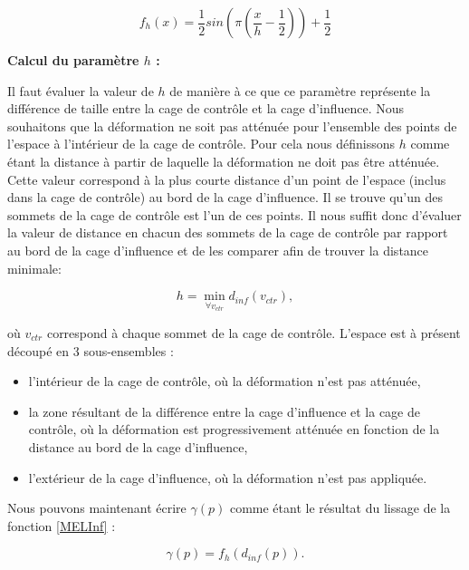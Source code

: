\begin{equation}
  f_h(x) = \frac{1}{2} sin(\pi(\frac{x}{h} - \frac{1}{2})) + \frac{1}{2}
\end{equation}

\textbf{Calcul du paramètre $h$ :}

Il faut évaluer la valeur de $h$ de manière à ce que ce paramètre représente
la différence de taille entre la cage de contrôle et la cage d'influence. Nous
souhaitons que la déformation ne soit pas atténuée pour l'ensemble des points
de l'espace à l'intérieur de la cage de contrôle. Pour cela nous définissons
$h$ comme étant la distance à partir de laquelle la déformation ne doit pas
être atténuée. Cette valeur correspond à la plus courte distance d'un point de
l'espace (inclus dans la cage de contrôle) au bord de la cage d'influence. Il
se trouve qu'un des sommets de la cage de contrôle est l'un de ces points. Il
nous suffit donc d'évaluer la valeur de distance en chacun des sommets de la
cage de contrôle par rapport au bord de la cage d'influence et de les comparer
afin de trouver la distance minimale:

\begin{equation}
  h = \min_{\forall v_{ctr}} d_{inf}(v_{ctr}),
\end{equation}

où $v_{ctr}$ correspond à chaque sommet de la cage de contrôle. L'espace est à
présent découpé en 3 sous-ensembles : \begin{itemize}

\item l'intérieur de la cage de contrôle, où la déformation n'est pas atténuée,

\item la zone résultant de la différence entre la cage d'influence et la cage
de contrôle, où la déformation est progressivement atténuée en fonction de la
distance au bord de la cage d'influence,

\item l'extérieur de la cage d'influence, où la déformation n'est pas
appliquée.

\end{itemize}

Nous pouvons maintenant écrire $\gamma(p)$ comme étant le résultat du lissage
de la fonction \ref{MELInf} :

\begin{equation}
  \gamma(p) = f_h(d_{inf}(p)).
\end{equation}

